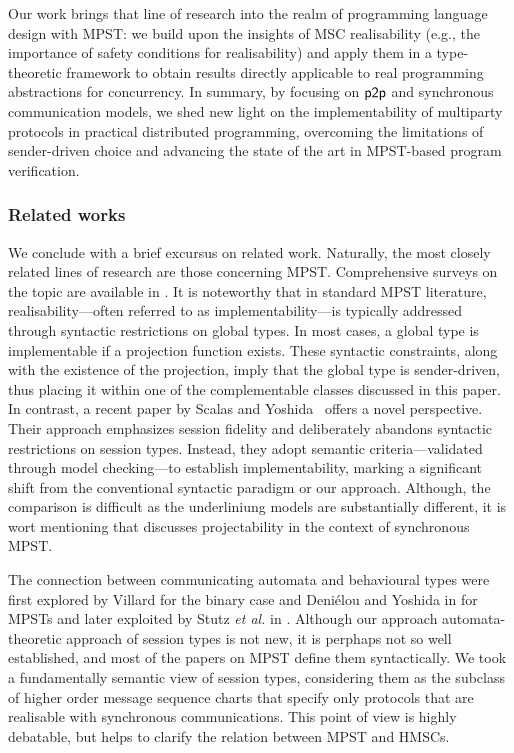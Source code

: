 Our work brings that line of research into the realm of programming language design with MPST: we build upon the insights of MSC realisability (e.g., the importance of safety conditions for realisability) and apply them in a type-theoretic framework to obtain results directly applicable to real programming abstractions for concurrency. 
In summary, by focusing on $\mathsf{p2p}$ and synchronous communication models, we shed new light on the implementability of multiparty protocols in practical distributed programming, overcoming the limitations of sender-driven choice and advancing the state of the art in MPST-based program verification.

\subsubsection*{\bf Related works}
We conclude with a brief excursus on related work. Naturally, the most closely related lines of research are those concerning MPST. Comprehensive surveys on the topic are available in \cite{Coppo2015, DBLP:conf/icdcit/YoshidaG20}.
It is noteworthy that in standard MPST literature, realisability—often referred to as implementability—is typically addressed through syntactic restrictions on global types. In most cases, a global type is  implementable if a projection function exists. These syntactic constraints, along with the existence of the projection, imply that the global type is sender-driven, thus placing it within one of the complementable classes discussed in this paper.
In contrast, a recent paper by Scalas and Yoshida~\cite{DBLP:journals/pacmpl/ScalasY19} offers a novel perspective. Their approach emphasizes session fidelity and deliberately abandons syntactic restrictions on session types. Instead, they adopt semantic criteria—validated through model checking—to establish implementability, marking a significant shift from the conventional syntactic paradigm or our approach.
Although, the comparison is difficult as the underliniung models are substantially different, it is wort mentioning \cite{10.1145/3678232.3678245} that discusses projectability in the context of synchronous MPST. 



The connection between communicating automata and behavioural types were 
first explored by Villard \cite{villard-phd} for the binary case and Deniélou and Yoshida in \cite{DBLP:conf/esop/DenielouY12} for MPSTs and later exploited by Stutz \emph{et al.} in \cite{DBLP:conf/cav/LiSWZ23,DBLP:conf/ecoop/Stutz23}.
Although our approach automata-theoretic approach of session types is not new, it is 
perphaps not so well established, and most of the papers on MPST define them syntactically.
We took a fundamentally semantic view of session types, considering them as the subclass of higher order message sequence charts 
that specify only protocols that are realisable with synchronous communications. This point of view is highly debatable, but 
helps to clarify the relation between MPST and HMSCs.


